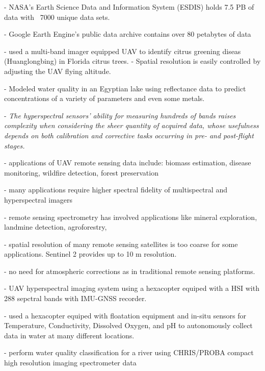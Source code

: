 \documentclass[journal,article,submit,pdftex,moreauthors]{Definitions/mdpi}
\begin{document}
- \cite{chi2016big} NASA's Earth Science Data and Information System (ESDIS) holds 7.5 PB of data with ~7000 unique data sets.

- Google Earth Engine's public data archive contains over 80 petabytes of data 

- \cite{garcia2013comparison} used a multi-band imager equipped UAV to identify citrus greening diseas (Huanglongbing) in Florida citrus trees.
- Spatial resolution is easily controlled by adjusting the UAV flying altitude.

- \cite{rostom2017evaluation} Modeled water quality in an Egyptian lake using reflectance data to predict concentrations of a variety of parameters and even some metals.

- \cite{adao2017hyperspectral} \textit{The hyperspectral sensors’ ability for measuring hundreds of bands raises complexity when considering the sheer quantity of acquired data, whose usefulness depends on both calibration and corrective tasks occurring in pre- and post-flight stages.}

- \cite{adao2017hyperspectral, padua2017uas} applications of UAV remote sensing data include: biomass estimation, disease monitoring, wildfire detection, forest preservation

- \cite{adao2017hyperspectral} many applications require higher spectral fidelity of multispectral and hyperspectral imagers

- \cite{adao2017hyperspectral} remote sensing spectrometry has involved applications like mineral exploration, landmine detection, agroforestry, 

- \cite{adao2017hyperspectral} spatial resolution of many remote sensing satellites is too coarse for some applications. Sentinel 2 provides up to 10 m resolution.

- \cite{adao2017hyperspectral} no need for atmospheric corrections as in traditional remote sensing platforms. 


- \cite{arroyo2019implementation} UAV hyperspectral imaging system using a hexacopter equiped with a HSI with 288 sepctral bands with IMU-GNSS recorder.

- \cite{koparan2018situ} used a hexacopter equiped with floatation equipment and in-situ sensors for Temperature, Conductivity, Dissolved Oxygen, and pH to autonomously collect data in water at many different locations.


- \cite{gursoy2019investigating} perform water quality classification for a river using CHRIS/PROBA compact high resolution imaging spectrometer data
\end{document}
